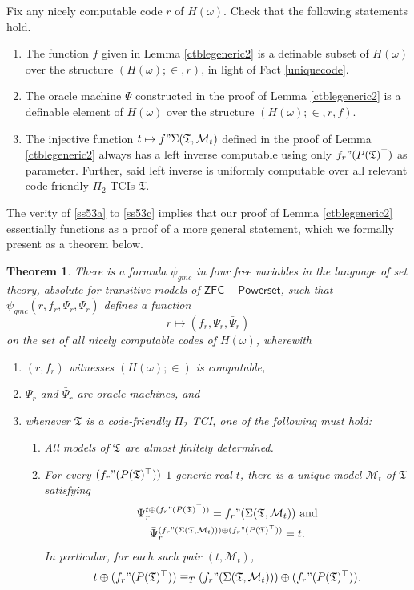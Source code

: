 \documentclass[12pt, twoside]{memoir}
\numberwithin{equation}{section}
\newtheorem{thm}{Theorem}[section]
\theoremstyle{definition}
\theoremstyle{remark}
\theoremstyle{definition}
\theoremstyle{definition}
\theoremstyle{definition}
\theoremstyle{remark}
\begin{document}
Fix any nicely computable code $r$ of $H(\omega)$. Check that the following statements hold.
\begin{enumerate}[label=(\Alph*)]
    \item\label{ss53a} The function $f$ given in Lemma \ref{ctblegeneric2} is a definable subset of $H(\omega)$ over the structure $(H(\omega); \in, r)$, in light of Fact \ref{uniquecode}.
    \item The oracle machine $\Psi$ constructed in the proof of Lemma \ref{ctblegeneric2} is a definable element of $H(\omega)$ over the structure $(H(\omega); \in, r, f)$.
    \item\label{ss53c} The injective function $t \mapsto f" \Sigma(\mathfrak{T}, \mathcal{M}_t)$ defined in the proof of Lemma \ref{ctblegeneric2} always has a left inverse computable using only $f_r" (P(\mathfrak{T})^{\top})$ as parameter. Further, said left inverse is uniformly computable over all relevant code-friendly $\Pi_2$ TCIs $\mathfrak{T}$.
\end{enumerate}
The verity of \ref{ss53a} to \ref{ss53c} implies that our proof of Lemma \ref{ctblegeneric2} essentially functions as a proof of a more general statement, which we formally present as a theorem below.

\begin{thm}\label{lastthm}
There is a formula $\psi_{gmc}$ in four free variables in the language of set theory, absolute for transitive models of $\mathsf{ZFC - Powerset}$, such that $\psi_{gmc}(r, f_r, \Psi_r, \bar{\Psi}_{r})$ defines a function $$r \mapsto (f_r, \Psi_r, \bar{\Psi}_{r})$$ on the set of all nicely computable codes of $H(\omega)$, wherewith
\begin{enumerate}[label=(\arabic*)]
    \item $(r, f_r)$ witnesses $(H(\omega); \in)$ is computable,
    \item $\Psi_r$ and $\bar{\Psi}_{r}$ are oracle machines, and
    \item whenever $\mathfrak{T}$ is a code-friendly $\Pi_2$ TCI, one of the following must hold:
    \begin{enumerate}[label=(\alph*)]
        \item All models of $\mathfrak{T}$ are almost finitely determined.
        \item For every $(f_r" (P(\mathfrak{T})^{\top}))$-$1$-generic real $t$, there is a unique model $\mathcal{M}_t$ of $\mathfrak{T}$ satisfying 
        \begin{gather*}
            \Psi_r^{t \oplus (f_r" (P(\mathfrak{T})^{\top}))} = f_r" (\Sigma(\mathfrak{T}, \mathcal{M}_t)) \text{ and} \\
            \bar{\Psi}_{r}^{(f_r" (\Sigma(\mathfrak{T}, \mathcal{M}_t))) \oplus (f_r" (P(\mathfrak{T})^{\top}))} = t.
        \end{gather*}
        In particular, for each such pair $(t, \mathcal{M}_t)$, $$t \oplus (f_r" (P(\mathfrak{T})^{\top})) \equiv_{T} (f_r" (\Sigma(\mathfrak{T}, \mathcal{M}_t))) \oplus (f_r" (P(\mathfrak{T})^{\top})).$$
\end{enumerate}
\end{enumerate}
\end{thm}
\end{document}
